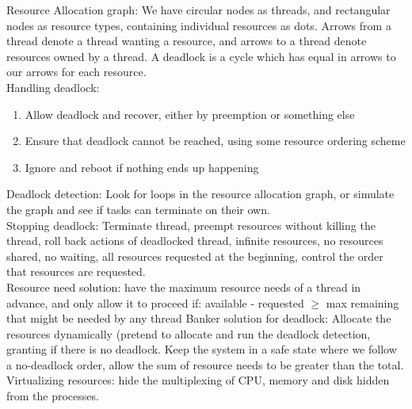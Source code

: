 \documentclass[paper=a4, fontsize=11pt]{scrartcl} %
\numberwithin{equation}{section} %
\numberwithin{figure}{section} %
\numberwithin{table}{section} %
\begin{document}
Resource Allocation graph: We have circular nodes as threads, and rectangular nodes as resource types, containing individual resources as dots. Arrows from a thread denote a thread wanting a resource, and arrows to a thread denote resources owned by a thread. A deadlock is a cycle which has equal in arrows to our arrows for each resource. \\
Handling deadlock: 
\begin{enumerate}
	\item Allow deadlock and recover, either by preemption or something else
    \item Ensure that deadlock cannot be reached, using some resource ordering scheme
    \item Ignore and reboot if nothing ends up happening
\end{enumerate}
Deadlock detection: Look for loops in the resource allocation graph, or simulate the graph and see if tasks can terminate on their own. \\
Stopping deadlock: Terminate thread, preempt resources without killing the thread, roll back actions of deadlocked thread, infinite resources, no resources shared, no waiting, all resources requested at the beginning, control the order that resources are requested. \\
Resource need solution: have the maximum resource needs of a thread in advance, and only allow it to proceed if: available - requested $\geq$ max remaining that might be needed by any thread
Banker solution for deadlock: Allocate the resources dynamically (pretend to allocate and run the deadlock detection, granting if there is no deadlock. Keep the system in a safe state where we follow a no-deadlock order, allow the sum of resource needs to be greater than the total. \\
Virtualizing resources: hide the multiplexing of CPU, memory and disk hidden from the processes. \\
\end{document}
